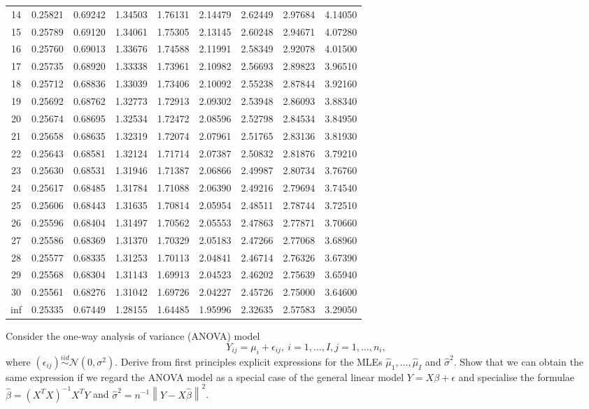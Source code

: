 {\begin{center}
\begin{tabular}{c|cccccccc}
14	&	0.25821	&	0.69242	&	1.34503	&	1.76131	&	2.14479	&	2.62449	&	2.97684	&	4.14050	\\
15	&	0.25789	&	0.69120	&	1.34061	&	1.75305	&	2.13145	&	2.60248	&	2.94671	&	4.07280	\\
16	&	0.25760	&	0.69013	&	1.33676	&	1.74588	&	2.11991	&	2.58349	&	2.92078	&	4.01500	\\
17	&	0.25735	&	0.68920	&	1.33338	&	1.73961	&	2.10982	&	2.56693	&	2.89823	&	3.96510	\\
18	&	0.25712	&	0.68836	&	1.33039	&	1.73406	&	2.10092	&	2.55238	&	2.87844	&	3.92160	\\
19	&	0.25692	&	0.68762	&	1.32773	&	1.72913	&	2.09302	&	2.53948	&	2.86093	&	3.88340	\\
20	&	0.25674	&	0.68695	&	1.32534	&	1.72472	&	2.08596	&	2.52798	&	2.84534	&	3.84950	\\
21	&	0.25658	&	0.68635	&	1.32319	&	1.72074	&	2.07961	&	2.51765	&	2.83136	&	3.81930	\\
22	&	0.25643	&	0.68581	&	1.32124	&	1.71714	&	2.07387	&	2.50832	&	2.81876	&	3.79210	\\
23	&	0.25630	&	0.68531	&	1.31946	&	1.71387	&	2.06866	&	2.49987	&	2.80734	&	3.76760	\\
24	&	0.25617	&	0.68485	&	1.31784	&	1.71088	&	2.06390	&	2.49216	&	2.79694	&	3.74540	\\
25	&	0.25606	&	0.68443	&	1.31635	&	1.70814	&	2.05954	&	2.48511	&	2.78744	&	3.72510	\\
26	&	0.25596	&	0.68404	&	1.31497	&	1.70562	&	2.05553	&	2.47863	&	2.77871	&	3.70660	\\
27	&	0.25586	&	0.68369	&	1.31370	&	1.70329	&	2.05183	&	2.47266	&	2.77068	&	3.68960	\\
28	&	0.25577	&	0.68335	&	1.31253	&	1.70113	&	2.04841	&	2.46714	&	2.76326	&	3.67390	\\
29	&	0.25568	&	0.68304	&	1.31143	&	1.69913	&	2.04523	&	2.46202	&	2.75639	&	3.65940	\\
30	&	0.25561	&	0.68276	&	1.31042	&	1.69726	&	2.04227	&	2.45726	&	2.75000	&	3.64600	\\
inf	&	0.25335	&	0.67449	&	1.28155	&	1.64485	&	1.95996	&	2.32635	&	2.57583	&	3.29050	\\
\end{tabular}
\end{center}
}





\item Consider the one-way analysis of variance (ANOVA) model
\begin{equation}
Y_{ij} = \mu_i + \epsilon_{ij}, \ i=1,\dots,I,j=1,\dots,n_i,
\end{equation}
where $(\epsilon_{ij})\stackrel{iid}{\sim}\mathcal{N}(0,\sigma^2)$. Derive from first principles explicit expressions for the MLEs $\hat{\mu}_1,\dots,\hat{\mu}_I$ and $\hat{\sigma}^2$. Show that we can obtain the same expression if we regard the ANOVA model as a special case of the general linear model $Y=X\beta +\epsilon$ and specialise the formulae $\hat{\beta}=(X^TX)^{-1}X^TY$ and $\hat{\sigma}^2=n^{-1}\left\|Y-X\hat{\beta}\right\|^2$.


